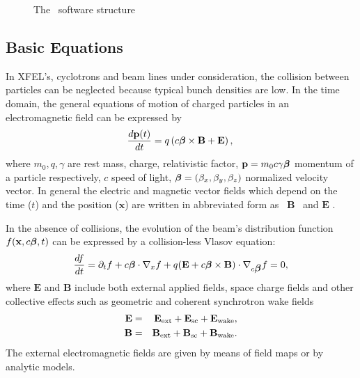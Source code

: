 \documentclass[acus]{JAC2003}
\newcommand{\bs}[1]{\mathbf #1}
\begin{document}
\begin{figure}[htb]
\begin{center}
\caption{The \opal\ software structure}
\label{fig:opalstr}
\end{center}
\end{figure}
\subsection{Basic Equations}
In XFEL's, cyclotrons and beam lines under consideration, the collision between particles can be neglected because typical bunch densities are low.
In the time domain, the general equations of motion of charged particles in an electromagnetic field can be expressed by
\begin{equation}\label{eq:motion}
  \frac{d\bs{p}(t)}{dt}  = q\left(c\mbox{\boldmath$\beta$}\times \bs{B} + \bs{E}\right), \nonumber \\
\end{equation}
where $m_0, q,\gamma$ are rest mass, charge, relativistic factor, $\bs{p}=m_0 c \gamma \mbox{\boldmath$\beta$}$ momentum of a particle respectively, 
$c$ speed of light, $\mbox{\boldmath$\beta$}=(\beta_x, \beta_y, \beta_z)$ normalized velocity vector. In general the electric and magnetic vector fields which depend on the time ($t$) and the position ($\bs{x}$) are
written in abbreviated form as \mbox{ $\bs{B}$ } and \mbox{$\bs{E}$} .

In the absence of collisions, the evolution of the beam's distribution function $ f(\bs {x},c\mbox{\boldmath$\beta$},t)$ can be expressed by a collision-less Vlasov equation:
\begin{equation}\label{eq:Vlasov}
  \frac{df}{dt}=\partial_t f + c\mbox{\boldmath$\beta$} \cdot \nabla_x f +q(\bs{E}+ c\mbox{\boldmath$\beta$}\times\bs{B})\cdot \nabla_{c\mbox{\boldmath$\beta$}} f  =  0, 
\end{equation}
where $\bs{E}$ and $\bs{B}$ include both external applied fields, space charge fields and other collective effects such as geometric and coherent synchrotron wake fields
\begin{eqnarray}\label{eq:Allfield}
  \bs{E} & = & \bs{E_{\RM{ext}}}+\bs{E_{\RM{sc}}}+\bs{E_{\RM{wake}}}, \nonumber\\    
  \bs{B} & = & \bs{B_{\RM{ext}}}+\bs{B_{\RM{sc}}}+\bs{B_{\RM{wake}}}.
\end{eqnarray}
The external electromagnetic fields are given by means of field maps or by analytic models. 
\end{document}

